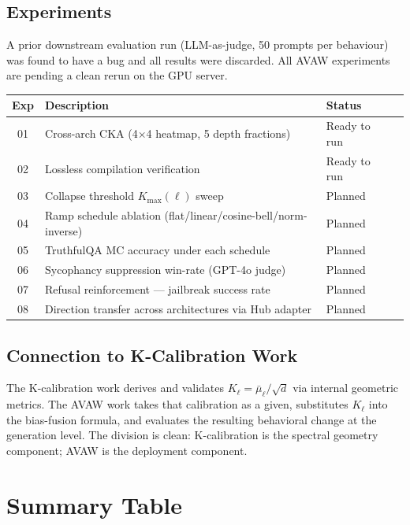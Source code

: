 \documentclass[11pt,a4paper]{article}
\begin{document}
\subsection{Experiments}

A prior downstream evaluation run (LLM-as-judge, 50 prompts per
behaviour) was found to have a bug and all results were discarded.
All AVAW experiments are pending a clean rerun on the GPU server.

\begin{center}\small
\begin{tabular}{clll}
\toprule
Exp & Description & Status \\
\midrule
01 & Cross-arch CKA (4$\times$4 heatmap, 5 depth fractions) & Ready to run \\
02 & Lossless compilation verification & Ready to run \\
03 & Collapse threshold $K_{\max}(\ell)$ sweep & Planned \\
04 & Ramp schedule ablation (flat/linear/cosine-bell/norm-inverse) & Planned \\
05 & TruthfulQA MC accuracy under each schedule & Planned \\
06 & Sycophancy suppression win-rate (GPT-4o judge) & Planned \\
07 & Refusal reinforcement — jailbreak success rate & Planned \\
08 & Direction transfer across architectures via Hub adapter & Planned \\
\bottomrule
\end{tabular}
\end{center}

\subsection{Connection to K-Calibration Work}

The K-calibration work derives and validates $K_\ell = \bar{\mu}_\ell/\sqrt{d}$ via internal
geometric metrics.
The AVAW work takes that calibration as a given, substitutes $K_\ell$ into the
bias-fusion formula, and evaluates the resulting behavioral change at the
generation level.
The division is clean: K-calibration is the spectral geometry component;
AVAW is the deployment component.

\section{Summary Table}
\end{document}
